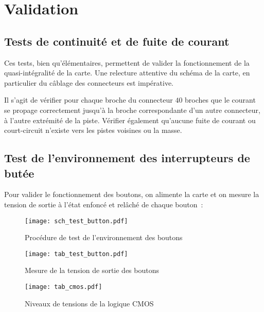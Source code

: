 \section{Validation}

\subsection{Tests de continuité et de fuite de courant}

Ces tests, bien qu'élémentaires, permettent de valider la fonctionnement de la quasi-intégralité de la carte. Une relecture attentive du schéma de la carte, en particulier du câblage des connecteurs est impérative.

\vspace{1cm}

Il s'agit de vérifier pour chaque broche du connecteur $40$ broches que le courant se propage correctement jusqu'à la broche correspondante d'un autre connecteur, à l'autre extrémité de la piste. Vérifier également qu'aucune fuite de courant ou court-circuit n'existe vers les pistes voisines ou la masse.

\subsection{Test de l'environnement des interrupteurs de butée}

Pour valider le fonctionnement des boutons, on alimente la carte et on mesure la tension de sortie à l'état enfoncé et relâché de chaque bouton~:

\begin{figure}[H]
    \centering
    \texttt{[image: sch\_test\_button.pdf]}
    \decoRule
    \caption[
    Procédure de test de l'environnement des boutons]{
    Procédure de test de l'environnement des boutons}
    \label{fig:Procédure de test de l'environnement des boutons}
	\end{figure}

\begin{figure}[H]
    \centering
	\texttt{[image: tab\_test\_button.pdf]}
    \decoRule
    \caption[
    Mesure de la tension de sortie des boutons]{
    Mesure de la tension de sortie des boutons}
    \label{fig:Mesure de la tension de sortie des boutons}
	\end{figure}


\begin{figure}[H]
    \centering
	\texttt{[image: tab\_cmos.pdf]}
    \decoRule
    \caption[
    Niveaux de tensions de la logique CMOS]{
    Niveaux de tensions de la logique CMOS}
    \label{fig:Niveaux de tensions de la logique CMOS}
	\end{figure}

